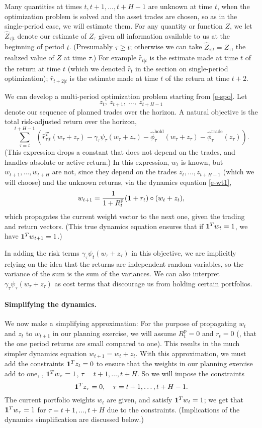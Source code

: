 \documentclass[openany]{now}
\newcommand{\trcosthat}{\hat \phi^\mathrm{trade}}
\newcommand{\hldcosthat}{\hat \phi^\mathrm{hold}}
\newcommand{\Rp}{R^\mathrm{p}}
\begin{document}
Many quantities at times $t,t+1, \ldots, t+H-1$ are unknown at time $t$,
when the optimization problem is solved and the asset trades are chosen,
so as in the single-period case, we will estimate them.
For any quantity or function $Z$, we let $\hat Z_{\tau|t}$ denote our estimate
of $Z_\tau$ given all information available to us at the beginning of period $t$.
(Presumably $\tau \geq t$; otherwise we can take $\hat Z_{\tau|t}=Z_\tau$, the
realized value of $Z$ at time $\tau$.)
For example $\hat r_{t|t}$ is the estimate made at time $t$ of the return at time
$t$ (which we denoted $\hat r_t$ in the section on single-period optimization);
$\hat r_{t+2|t}$ is the estimate made at time $t$ of the return at time $t+2$.

We can develop a multi-period optimization problem
starting from \eqref{e-spo}.
Let
\[
z_t,~ z_{t+1},~ \ldots, ~z_{t+H-1}
\]
denote our sequence of planned trades over the horizon.
A natural objective is the total risk-adjusted return over the
horizon,
\[
\sum_{\tau=t}^{t+H-1} \left( \hat r_{\tau|t}^T (w_\tau + z_\tau)
-\gamma_\tau \psi_\tau(w_\tau+z_\tau)  - \hldcosthat_\tau (w_\tau + z_\tau)
- \trcosthat_\tau (z_\tau)\right).
\]
(This expression drops a constant that does not depend on the trades,
and handles absolute or active return.)
In this expression, $w_t$ is known, but $w_{t+1}, \ldots, w_{t+H}$ are not,
since they depend on the trades $z_t, \ldots, z_{t+H-1}$
(which we will choose) and the unknown returns,
via the dynamics equation \eqref{e-wt1},
\[
w_{t+1} = \frac{1}{1+\Rp_t} (\ones + r_t) \circ (w_t+z_t),
\]
which propagates the current weight vector
to the next one, given the trading and return vectors.
(This true dynamics equation ensures that if $\mathbf 1^Tw_t=1$,
we have $\mathbf 1^Tw_{t+1}=1$.)

In adding the risk terms $\gamma_\tau \psi_t(w_\tau+z_\tau)$ in this objective,
we are implicitly relying on the idea that the returns are independent
random variables, so the variance of the sum is the sum of the
variances.
We can also interpret $\gamma_\tau \psi_\tau(w_\tau+z_\tau)$ as
cost terms that discourage us from holding certain portfolios.

\paragraph{Simplifying the dynamics.}
We now make a simplifying approximation:  For the purpose of propagating
$w_t$ and $z_t$ to $w_{t+1}$ in our planning exercise,
we will assume $\Rp_t=0$ and $r_t=0$
(\ie, that the one period returns are small compared to one).
This results in the much simpler dynamics equation
$w_{t+1} = w_t + z_t$.
With this approximation, we must add the constraints
$\mathbf 1^Tz_t = 0$ to ensure that the weights in our planning
exercise add to one, \ie, $\mathbf 1^T w_\tau=1$, $\tau=t+1,\ldots, t+H$.
So we will impose the
constraints
\[
\mathbf 1^Tz_\tau = 0, \quad \tau=t+1,\ldots,t+H-1.
\]
The current portfolio weights $w_t$ are given, and satisfy $\mathbf 1^T w_t=1$;
we get that $\mathbf 1^Tw_\tau = 1$ for $\tau=t+1,\ldots,t+H$ due to the
constraints.
(Implications of the dynamics simplification are discussed below.)
\end{document}
